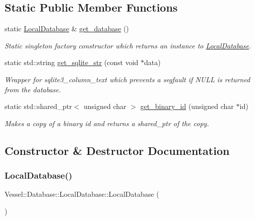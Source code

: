 \subsection*{Static Public Member Functions}
\begin{DoxyCompactItemize}
\item 
static \hyperlink{class_vessel_1_1_database_1_1_local_database}{Local\+Database} \& \hyperlink{class_vessel_1_1_database_1_1_local_database_ad5d9f9dda2ad243ca640f7cf07de34d7}{get\+\_\+database} ()
\begin{DoxyCompactList}\small\item\em Static singleton factory constructor which returns an instance to \hyperlink{class_vessel_1_1_database_1_1_local_database}{Local\+Database}. \end{DoxyCompactList}\item 
static std\+::string \hyperlink{class_vessel_1_1_database_1_1_local_database_a1561145d386751e09b23b80a723735c4}{get\+\_\+sqlite\+\_\+str} (const void $\ast$data)
\begin{DoxyCompactList}\small\item\em Wrapper for sqlite3\+\_\+column\+\_\+text which prevents a segfault if N\+U\+LL is returned from the database. \end{DoxyCompactList}\item 
static std\+::shared\+\_\+ptr$<$ unsigned char $>$ \hyperlink{class_vessel_1_1_database_1_1_local_database_a2fabf54b26f3d3b0b29b1a682f8ed718}{get\+\_\+binary\+\_\+id} (unsigned char $\ast$id)
\begin{DoxyCompactList}\small\item\em Makes a copy of a binary id and returns a shared\+\_\+ptr of the copy. \end{DoxyCompactList}\end{DoxyCompactItemize}


\subsection{Constructor \& Destructor Documentation}
\mbox{\label{class_vessel_1_1_database_1_1_local_database_af2180ec115f920bb5cf9915da9873478}} 
\subsubsection{\texorpdfstring{Local\+Database()}{LocalDatabase()}}
{\footnotesize\ttfamily Vessel\+::\+Database\+::\+Local\+Database\+::\+Local\+Database (\begin{DoxyParamCaption}\item[{\hyperlink{class_vessel_1_1_database_1_1_local_database}{Local\+Database} const \&}]{ }\end{DoxyParamCaption})\hspace{0.3cm}{\ttfamily [delete]}}

